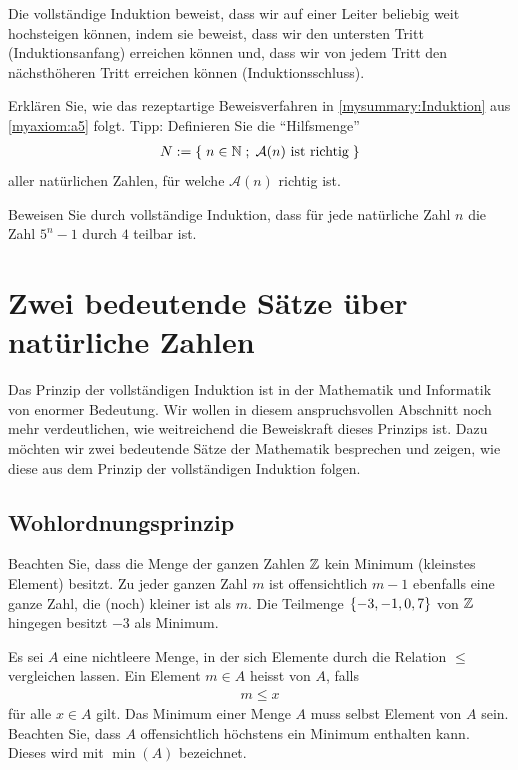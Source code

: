 \begin{myremark}
	Die vollständige Induktion beweist, dass wir auf einer Leiter beliebig weit hochsteigen können, indem sie beweist, dass wir den untersten Tritt (Induktionsanfang) erreichen
	können und, dass wir von jedem Tritt den nächsthöheren Tritt erreichen können (Induktionsschluss).
\end{myremark}

\begin{myexercise}\label{myexercise:0201}
	Erklären Sie, wie das rezeptartige Beweisverfahren in \cref{mysummary:Induktion} aus \cref{myaxiom:a5} folgt. Tipp: Definieren Sie die \enquote{Hilfsmenge}
	\begin{align*}
		N := \left\{\;n\in\mathbb{N} \; ; \; \text{$\mathcal{A}(n)$ ist richtig} \;\right\}
	\end{align*}
	aller natürlichen Zahlen, für welche $\mathcal{A}(n)$ richtig ist.
\end{myexercise}

\begin{myexercise}\label{myexercise:0202}
	Beweisen Sie durch vollständige Induktion, dass für jede natürliche Zahl $n$ die Zahl $5^n-1$ durch $4$ teilbar ist.
\end{myexercise}

\section{Zwei bedeutende Sätze über natürliche Zahlen}
Das Prinzip der vollständigen Induktion ist in der Mathematik und Informatik von enormer Bedeutung. Wir wollen in diesem anspruchsvollen Abschnitt noch mehr verdeutlichen, wie weitreichend die Beweiskraft dieses Prinzips ist. Dazu möchten wir zwei bedeutende Sätze der Mathematik besprechen und zeigen, wie diese aus dem Prinzip der vollständigen Induktion folgen.
\subsection{Wohlordnungsprinzip}
Beachten Sie, dass die Menge der ganzen Zahlen $\mathbb{Z}$ kein Minimum (kleinstes Element) besitzt. Zu jeder ganzen Zahl $m$ ist offensichtlich $m-1$ ebenfalls eine ganze Zahl, die (noch) kleiner ist als $m$. Die Teilmenge $\left\{-3,-1,0,7\right\}$ von $\mathbb{Z}$ hingegen besitzt $-3$ als Minimum.
\begin{mydefinition}[Minimum]\label{mydefinition:min}
Es sei $A$ eine nichtleere Menge, in der sich Elemente durch die Relation $\leq$ vergleichen lassen. Ein Element $m\in A$ heisst  von $A$, falls
\begin{align*}
	m \leq x
\end{align*}
für alle $x\in A$ gilt. Das Minimum einer Menge $A$ muss selbst Element von $A$ sein. Beachten Sie, dass $A$ offensichtlich höchstens ein Minimum enthalten kann. Dieses wird mit $\min(A)$ bezeichnet.
\end{mydefinition}

